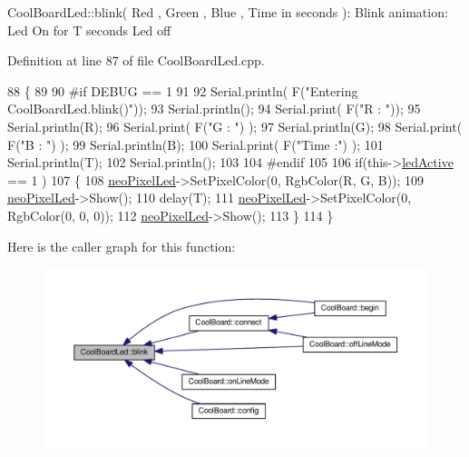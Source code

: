 Cool\+Board\+Led\+::blink( Red , Green , Blue , Time in seconds )\+: Blink animation\+: Led On for T seconds Led off 

Definition at line 87 of file Cool\+Board\+Led.\+cpp.


\begin{DoxyCode}
88 \{
89 
90 \textcolor{preprocessor}{#if DEBUG == 1}
91 
92     Serial.println( F(\textcolor{stringliteral}{"Entering CoolBoardLed.blink()"}));
93     Serial.println();
94     Serial.print( F(\textcolor{stringliteral}{"R : "}));
95     Serial.println(R);
96     Serial.print( F(\textcolor{stringliteral}{"G : "}) );
97     Serial.println(G);
98     Serial.print( F(\textcolor{stringliteral}{"B : "}) );
99     Serial.println(B);
100     Serial.print( F(\textcolor{stringliteral}{"Time :"}) );
101     Serial.println(T);
102     Serial.println();
103 
104 \textcolor{preprocessor}{#endif  }
105 
106     \textcolor{keywordflow}{if}(this->\hyperlink{class_cool_board_led_aadd04d2ecf123247718d77f42fba7f08}{ledActive} == 1 )
107     \{
108         \hyperlink{class_cool_board_led_ac2c13fa462a010cd9242bf297c013923}{neoPixelLed}->SetPixelColor(0, RgbColor(R, G, B));
109         \hyperlink{class_cool_board_led_ac2c13fa462a010cd9242bf297c013923}{neoPixelLed}->Show();
110         delay(T);
111         \hyperlink{class_cool_board_led_ac2c13fa462a010cd9242bf297c013923}{neoPixelLed}->SetPixelColor(0, RgbColor(0, 0, 0));
112         \hyperlink{class_cool_board_led_ac2c13fa462a010cd9242bf297c013923}{neoPixelLed}->Show();
113     \}
114 \}
\end{DoxyCode}
Here is the caller graph for this function\+:\nopagebreak
\begin{figure}[H]
\begin{center}
\leavevmode
\includegraphics[width=350pt]{de/dc0/class_cool_board_led_a96e1ea13003eee34c9dbcef340404426_icgraph}
\end{center}
\end{figure}
\mbox{\label{class_cool_board_led_a1b60e5e30bea96c49ed62ed1bf1ffc8b}} 
